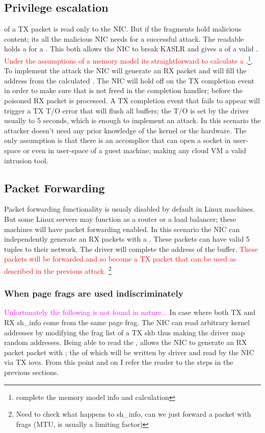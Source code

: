 \subsection{Privilege escalation}
\shinfo of a TX packet is read only to the NIC.
But if the fragments hold malicious content; its all the malicious NIC needs for a successful attack. The readable \shinfo holds a \kva for a \page. This both allows the NIC to break KASLR and gives a \kva of a valid \mabaf. \textcolor{red}{Under the assumptions of a memory model its straightforward to calculate a \kva}.\footnote{complete the memory model info and calculation}. To implement the attack the NIC will generate an RX packet and will fill the \uarg address from the calculated \kva.
The NIC will hold off on the TX completion event in order to make sure that \kva is not freed in the completion handler; before the poisoned RX packet is processed. A TX completion event that fails to appear will trigger a TX T/O error that will flush all buffers; the T/O is set by the driver usually to 5 seconds, which is enough to implement an attack.\newline
In this scenario the attacker doesn't need any prior knowledge of the kernel or the hardware. The only assumption is that there is an accomplice that can open a socket in user-space or even in user-space of a guest machine; making any cloud VM a valid intrusion tool.

\subsection{Packet Forwarding}
Packet forwarding functionality is usualy disabled by default in Linux machines. But some Linux servers may function as a router or a load balancer; these machines will have packet forwarding enabled. In this scenario the NIC can independently generate an RX packets with a \mabaf. These packets can have valid 5 tuples to their network. The driver will complete the \page address of the buffer. \textcolor{red}{These packets will be forwarded and so become a TX packet that can be used as described in the previous attack.} \footnote{Need to check what happens to sh\_info, can we just forward a packet with frags (MTU, is usually a limiting factor)}

\subsubsection{When page frags are used indiscriminately}
\textcolor{magenta}{Unfortunately the following is not found in nature...}\newline
In case where both TX and RX sh\_info come from the same page frag. The NIC can read arbitrary kernel addresses by modifying the frag list of a TX skb thus making the driver map random addresses.
Being able to read the \shinfo, allows the NIC to generate an RX packet packet with \mabaf; the \kva of which will be written by driver and read by the NIC via TX iova. From this point and on I refer the reader to the steps in the previous sections.